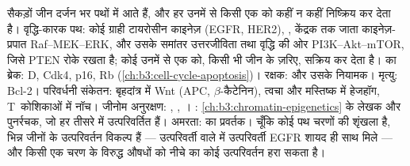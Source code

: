 \begin{proposition}[जिन पथों पर चोट पड़ती है]\label{prop:b3:cancer-biology:pathways}
सैकड़ों  जीन दर्जन भर पथों में आते हैं, और हर  उनमें से किसी
एक को कहीं न कहीं निष्क्रिय कर देता है। वृद्धि-कारक पथ: कोई ग्राही
टायरोसीन काइनेज़ (EGFR, HER2), , केंद्रक तक जाता काइनेज़-प्रपात
Raf--MEK--ERK, और उसके समांतर उत्तरजीविता तथा वृद्धि की ओर
PI3K--Akt--mTOR, जिसे PTEN रोके रखता है; कोई  उनमें से एक को,
किसी भी जीन के ज़रिए, सक्रिय कर देता है।
 का ब्रेक:  D, Cdk4, p16, Rb (\cref{ch:b3:cell-cycle-apoptosis})।
रक्षक:  और उसके नियामक। मृत्यु: Bcl-2। परिवर्धनी
संकेतन: बृहदांत्र में Wnt (APC, $\beta$-कैटेनिन), त्वचा और मस्तिष्क में
हेजहॉग, T~कोशिकाओं में नॉच। जीनोम अनुरक्षण: ,
, । : \cref{ch:b3:chromatin-epigenetics} के लेखक और
पुनर्रचक, जो हर तीसरे  में उत्परिवर्तित हैं।
अमरता:  का प्रवर्तक। चूँकि कोई पथ चरणों की शृंखला है, भिन्न
जीनों के उत्परिवर्तन विकल्प हैं --- उत्परिवर्ती  वाले  में
उत्परिवर्ती EGFR शायद ही साथ मिले --- और किसी एक चरण के विरुद्ध औषधों
को नीचे का कोई उत्परिवर्तन हरा सकता है।
\end{proposition}

